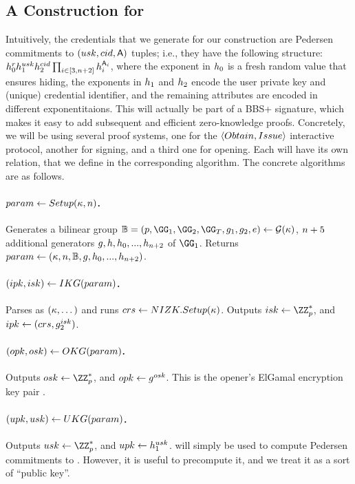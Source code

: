 \subsection{A Construction for \GSAC}
\label{ssec:construction-gsac}

Intuitively, the credentials that we generate for our \GSAC construction are
Pedersen commitments to $(usk,cid,\mathsf{A})$ tuples; i.e., they have
the following structure: $h_0^rh_1^{usk}h_2^{cid}
\prod_{i \in [3,n+2]}h_i^{\mathsf{A}_i}$, where the exponent in
$h_0$ is a fresh random value that ensures hiding, the exponents in
$h_1$ and $h_2$ encode the user private key and (unique) credential
identifier, and the remaining attributes are encoded in different
exponentitaions. This will actually be part of a BBS+ signature, which makes it
easy to add subsequent and efficient zero-knowledge proofs. Concretely, we will
be using several \NIZK proof systems, one for the $\langle Obtain,Issue
\rangle$ interactive protocol, another for signing, and a third one for opening.
Each will have its own relation, that we define in the corresponding algorithm.
The concrete algorithms are as follows.

\paragraph{$param \gets Setup(\kappa,n)$.} %
Generates a bilinear group $\BB = (p,\GG_1,\GG_2,\GG_T,\gen{g}_1,\gen{g}_2,e) \gets
\PGen(\secpar)$, $n+5$ additional generators $g,h,h_0,...,
h_{n+2}$ of $\GG_1$. Returns $param \gets
(\kappa,n,\mathbb{B},g,h_0,...,h_{n+2})$.

\paragraph{$(ipk,isk) \gets IKG(param)$.} %
Parses \parm as $(\kappa,\dots)$ and runs $crs \gets NIZK.Setup(\kappa)$.
Outputs $\isk \gets \ZZ^*_p$, and $ipk \gets (crs,g_2^{isk})$.

\paragraph{$(opk,osk) \gets OKG(param)$.} %
Outputs $\osk \gets \ZZ^*_p$, and $opk \gets g^{osk}$. This is the
opener's ElGamal encryption key pair \needcite.

\paragraph{$(upk,usk) \gets UKG(param)$.} %
Outputs $\usk \gets \ZZ^*_p$, and $upk \gets h_1^{usk}$. \upk will
simply be used to compute Pedersen commitments \needcite to \usk. However,
it is useful to precompute it, and we treat it as a sort of ``public key''.

